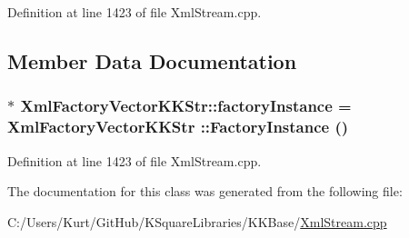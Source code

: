 Definition at line 1423 of file Xml\+Stream.\+cpp.



\subsection{Member Data Documentation}
\subsubsection[{\texorpdfstring{factory\+Instance}{factoryInstance}}]{ $\ast$ Xml\+Factory\+Vector\+K\+K\+Str\+::factory\+Instance = {\bf Xml\+Factory\+Vector\+K\+K\+Str} \+::{\bf Factory\+Instance} ()\hspace{0.3cm}{\ttfamily [static]}}\hypertarget{class_xml_factory_vector_k_k_str_a9ba9c26b3a45e3a8f31e7fe69f1b82fe}{}\label{class_xml_factory_vector_k_k_str_a9ba9c26b3a45e3a8f31e7fe69f1b82fe}


Definition at line 1423 of file Xml\+Stream.\+cpp.



The documentation for this class was generated from the following file\+:\begin{DoxyCompactItemize}
\item 
C\+:/\+Users/\+Kurt/\+Git\+Hub/\+K\+Square\+Libraries/\+K\+K\+Base/\hyperlink{_xml_stream_8cpp}{Xml\+Stream.\+cpp}\end{DoxyCompactItemize}
